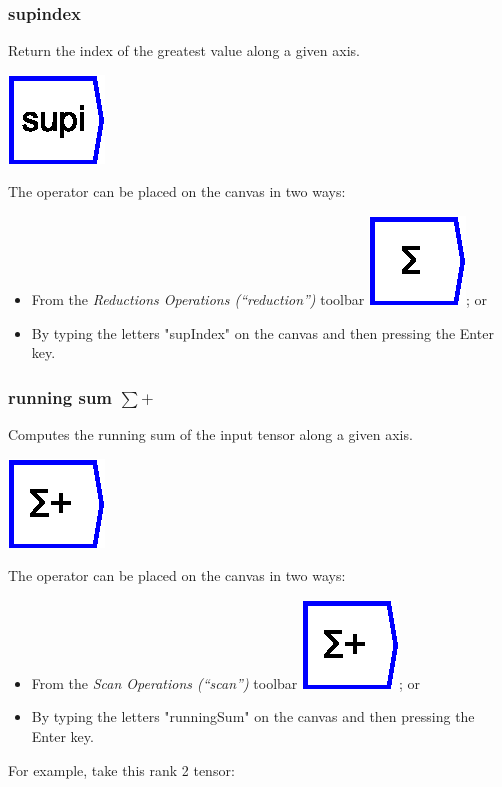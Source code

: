 \subsubsection{supindex}

\label{Operation:supIndex} Return the index of the greatest value
along a given axis.

\includegraphics{images/supindex}

The operator can be placed on the canvas in two ways:
\begin{itemize}
\item From the \emph{Reductions Operations (``reduction'')} toolbar \includegraphics{images/sum};
or 
\item By typing the letters "supIndex" on the canvas and then pressing
the Enter key.
\end{itemize}

\subsubsection{running sum $\sum+$}

\label{Operation:runningSum} Computes the running sum of the input
tensor along a given axis.

\includegraphics{images/runningSum}

The operator can be placed on the canvas in two ways:
\begin{itemize}
\item From the \emph{Scan Operations (``scan'') }toolbar \includegraphics{images/runningSum};
or 
\item By typing the letters "runningSum" on the canvas and then pressing
the Enter key.
\end{itemize}
For example, take this rank 2 tensor:

